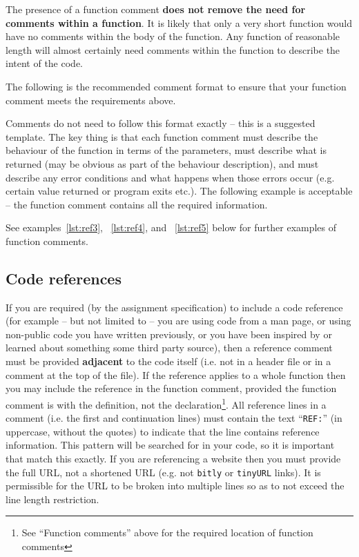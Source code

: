 \documentclass{article}
\newcommand{\icon}[1]{\raisebox{-3pt}{\texttt{[image: icons/\#1.png]}}}
\begin{document}
The presence of a function comment \textbf{does not remove the need for comments within a function}. It is likely that only a very short
function would have no comments within the body of the function. Any function of reasonable length will almost certainly need
comments within the function to describe the intent of the code.

The following is the recommended comment format to ensure that your function comment meets the requirements above.

\nolinenumbers
{}

\linenumbers

Comments do not need to follow this format exactly -- this is a suggested template. The key thing is that each function comment 
must describe the behaviour of the function in terms of the parameters, must describe what is returned (may be obvious as 
part of the behaviour description), and must describe any error conditions and what happens when those errors occur (e.g.
certain value returned or program exits etc.). The following example is acceptable -- the function comment contains all 
the required information.

\nolinenumbers
{}

\linenumbers

See examples~\ref{lst:ref3}, ~\ref{lst:ref4}, and ~\ref{lst:ref5}  below for further examples of function comments.

\subsection{Code references \protect\hfill\icon{MANUAL-CHECK}}
If you are required (by the assignment specification) 
to include a code reference (for example -- but not limited to -- you are using code from a man page, or using non-public code you have 
written previously, or you have been inspired by or learned about something some third party source), then a reference comment must be provided
\textbf{adjacent} to the code itself (i.e. not in a header file or in a comment at the top of the file). If the reference applies to a whole
function then you may include the reference in the function comment, provided the function comment is with the definition, not the declaration\footnote{See ``Function comments'' above for the required location of function comments}. All reference lines 
in a comment (i.e. the first and continuation lines) must contain the text ``\texttt{REF:}'' (in uppercase, 
without the quotes) to indicate that the line contains reference information. This pattern will be searched for in your code, so it is important that match this exactly. If you are referencing a website then you must provide the full URL, not a shortened URL (e.g. not \texttt{bitly} or \texttt{tinyURL} links). 
It is permissible for the URL to be broken into multiple lines so as to not exceed the line length restriction.
\end{document}
